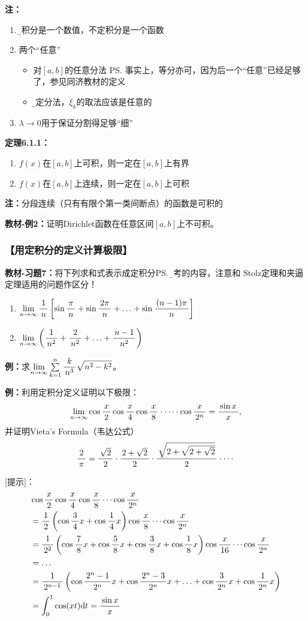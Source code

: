 {\bf 注：}
\begin{enumerate}[(1)]
  \setlength{\itemindent}{1cm}
  \item {\b 定积分是一个数值，不定积分是一个函数}
  \item 两个“任意”
  \begin{itemize}
    \item 对$[a,b]$的任意分法
    \ps{事实上，等分亦可，因为后一个“任意”已经足够了，参见同济教材的定义}
    \item {\b 给定分法，$\xi_k$的取法应该是任意的}
  \end{itemize}
  \item $\lambda\to 0$用于保证分割得足够“细”
\end{enumerate}

{\bf 定理6.1.1：}
\begin{enumerate}[(1)]
  \setlength{\itemindent}{1cm}
  \item $f(x)$在$[a,b]$上可积，则一定在$[a,b]$上有界 
  \item $f(x)$在$[a,b]$上连续，则一定在$[a,b]$上可积 
\end{enumerate}

{\bf 注：}分段连续（只有有限个第一类间断点）的函数是可积的

{\bf 教材-例2：}证明Dirichlet函数在任意区间$[a,b]$上不可积。

\subsubsection{【用定积分的定义计算极限】}

{\bf 教材-习题7：}将下列求和式表示成定积分\ps{\b 常考的内容，注意和
Stolz定理和夹逼定理适用的问题作区分！}
\begin{enumerate}[(1)]
  \setlength{\itemindent}{1cm}
  \item $\limn\df 1n\left[\sin\df{\pi}{n}+\sin\df{2\pi}{n}+\ldots
  +\sin\df{(n-1)\pi}{n}\right]$ 
  \item $\limn\left(\df{1}{n^2}+\df{2}{n^2}+\ldots+\df{n-1}{n^2}\right)$
\end{enumerate}

{\bf 例：}求$\limn\sum\limits_{k=1}^n\df{k}{n^3}\sqrt{n^2-k^2}$。

{\bf 例：}利用定积分定义证明以下极限：
$$\limn\cos\df x2\cos\df x4\cos\df x8\cdot\cdots\cdot\cos\df x{2^n}
=\df{\sin x}x,$$
并证明Vieta's Formula（韦达公式）
$$\df2\pi=\df{\sqrt2}2\cdot\df{2+\sqrt2}2\cdot\df{\sqrt{2+\sqrt{2+\sqrt2}}}2
\cdot\cdots$$

[提示]：
\begin{align}
	&\cos\df x2\cos\df x4\cos\df x8\cdots\cos\df x{2^n}\notag\\
	&=\df12\left(\cos\df34x+\cos\df14x\right)\cos\df x8\cdots\cos\df
	x{2^n}\notag\\
	&=\df1{2^2}\left(\cos\df78x+\cos\df58x+\cos\df38x+\cos\df18x\right)
	\cos\df x{16}\cdots\cos\df x{2^n}\notag\\
	&=\ldots\notag\\
	&=\df1{2^{n-1}}\left(\cos\df{2^n-1}{2^n}x+\cos\df{2^n-3}{2^n}x+
	\ldots+\cos\df3{2^n}x+\cos\df1{2^n}x\right)\notag\\
	&=\dint_0^1\cos(xt)\d t=\df{\sin x}x\notag
\end{align}

